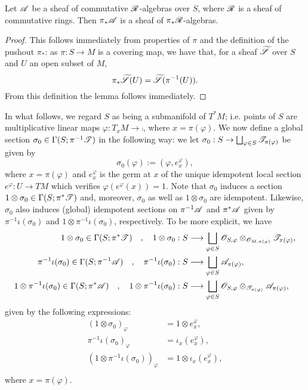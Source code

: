 \begin{lemma}
Let $\mathscr{A}$ be a sheaf of commutative $\mathscr{R}$-algebras over $S$, where $\mathscr{R}$ is a sheaf of commutative rings. Then $\pi_*\mathscr{A}$ is a sheaf of $\pi_*\mathscr{R}$-algebras. 
\end{lemma}
\begin{proof}
This follows immediately from properties of $\pi$ and the definition of the pushout $\pi_*$: as $\pi :S\to M$ is a covering map, we have that, for a sheaf $\widetilde{\mathscr{S}}$ over $S$ and $U$ an open subset of $M$,
$$\pi_*\widetilde{\mathscr{S}}(U)=\widetilde{\mathscr{S}}(\pi^{-1}(U)).$$
From this definition the lemma follows immediately.
\end{proof}

In what follows, we regard $S$ as being a submanifold of $T^*M$; i.e. points of $S$ are multiplicative linear maps $\varphi :T_xM\to \comp$, where $x=\pi (\varphi )$. We now define a global section $\sigma_0\in \Gamma (S;\pi^{-1}\mathscr{T})$ in the following way: we let $\sigma_0:S\to \bigsqcup_{\varphi \in S}\mathscr{T}_{\pi (\varphi )}$ be given by
$$\sigma_0(\varphi ):=(\varphi ,e^{\varphi}_x),$$
where $x=\pi (\varphi )$ and $e^{\varphi}_x$ is the germ at $x$ of the unique idempotent local section $e^{\varphi}:U\to TM$ which verifies $\varphi (e^{\varphi}(x))=1$. Note that $\sigma_0$ induces a section $1\otimes \sigma_0\in \Gamma (S;\pi^*\mathscr{T})$ and, moreover, $\sigma_0$ as well as $1\otimes \sigma_0$ are idempotent. Likewise, $\sigma_0$ also induces (global) idempotent sections on $\pi^{-1}\mathscr{A}$ and $\pi^*\mathscr{A}$ given by $\pi^{-1}\iota (\sigma_0)$ and $1\otimes \pi^{-1}\iota (\sigma_0)$, respectively. To be more explicit, we have
$$
\begin{aligned}
1\otimes \sigma_0 \in \Gamma (S;\pi^*\mathscr{T}) \quad , \quad 1\otimes \sigma_0 &:S\longrightarrow \bigsqcup_{\varphi \in S}\mathscr{O}_{S,\varphi}\otimes_{\mathscr{O}_{M,\pi (\varphi )}}\mathscr{T}_{\pi (\varphi )}, \\
\pi^{-1}\iota (\sigma_0) \in \Gamma(S;\pi^{-1}\mathscr{A}) \quad , \quad \pi^{-1}\iota (\sigma_0) &: S\longrightarrow \bigsqcup_{\varphi \in S}\mathscr{A}_{\pi (\varphi )}, \\
1\otimes \pi^{-1}\iota (\sigma_0) \in \Gamma (S;\pi^*\mathscr{A}) \quad , \quad 1\otimes \pi^{-1}\iota (\sigma_0) &: S\longrightarrow \bigsqcup_{\varphi \in S}\mathscr{O}_{S,\varphi}\otimes_{\mathscr{T}_{\pi (\varphi )}}\mathscr{A}_{\pi (\varphi )}, \\
\end{aligned}
$$
given by the following expressions:
$$
\begin{aligned}
(1\otimes \sigma_0)_\varphi &= 1\otimes e^{\varphi}_x ,\\
\pi^{-1}\iota (\sigma_0)_\varphi &= \iota_x(e^{\varphi}_x), \\
(1\otimes \pi^{-1}\iota (\sigma_0))_\varphi &= 1\otimes \iota_x(e^{\varphi}_x), \\
\end{aligned}
$$
where $x=\pi (\varphi )$.

